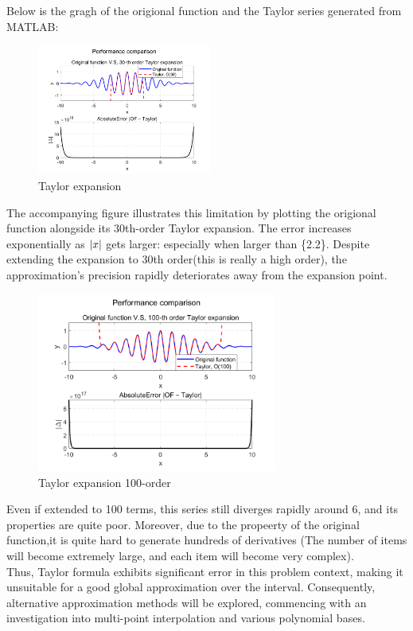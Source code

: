 \documentclass[11pt]{article}
\DeclarePairedDelimiter{\modd}{|}{|}
\begin{document}
Below is the gragh of the origional function and the Taylor series generated from MATLAB:
\begin{figure}[h]
\centering
\includegraphics[width=0.51\textwidth]{Taylor.png}
\caption{Taylor expansion}
\end{figure}

The accompanying figure illustrates this limitation by plotting the origional function alongside 
its 30th-order Taylor expansion. The error increases exponentially as $\modd{x}$ gets larger: especially when larger than \{2.2\}. 
Despite extending the expansion to 30th order(this is really a high order), the approximation's 
precision rapidly deteriorates away from the expansion point.\\
\begin{figure}[h]
\centering
\includegraphics[width=0.7\textwidth]{Taylor2.png}
\caption{Taylor expansion 100-order}
\end{figure}
Even if extended to 100 terms, this series still diverges rapidly around {6}, and its properties are quite poor. Moreover, due to 
the propeerty of the original function,it is quite hard to generate hundreds of derivatives (The number of items will become extremely large, and each item will become very complex). \\
Thus, Taylor formula exhibits significant error in this problem context, 
making it unsuitable for a good global approximation over the interval. Consequently, alternative approximation methods will be explored, 
commencing with an investigation into multi-point interpolation and various polynomial bases.
\end{document}
